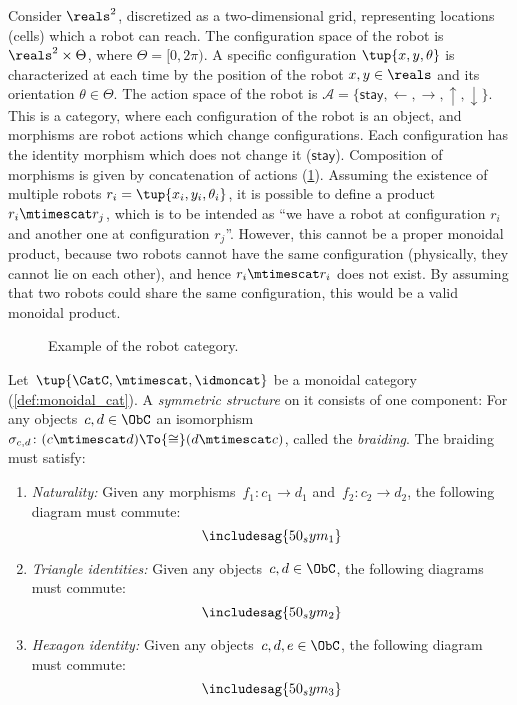 \begin{example}
  \label{ex:robot}
  Consider $\reals^2$, discretized as a two-dimensional grid, representing locations (cells) which a robot can reach. The configuration space of the robot is $\reals^2\times \Theta$, where $\Theta=[0,2\pi)$. A specific configuration $\tup{x,y,\theta}$ is characterized at each time by the position of the robot $x,y\in \reals$ and its orientation $\theta \in \Theta$. The action space of the robot is $\mathcal{A}=\{\mathsf{stay},\leftarrow, \rightarrow, \uparrow, \downarrow\}$. This is a category, where each configuration of the robot is an object, and morphisms are robot actions which change configurations. Each configuration has the identity morphism which does not change it ($\mathsf{stay}$). Composition of morphisms is given by concatenation of actions (\cref{fig:robotcategory}). Assuming the existence of multiple robots $r_i=\tup{x_i,y_i,\theta_i}$, it is possible to define a product $r_i\mtimescat r_j$, which is to be intended as ``we have a robot at configuration $r_i$ and another one at configuration $r_j$''. However, this cannot be a proper monoidal product, because two robots cannot have the same configuration (physically, they cannot lie on each other), and hence $r_i\mtimescat r_i$ does not exist. By assuming that two robots could share the same configuration, this would be a valid monoidal product.
  \begin{figure}[tbh]
    \begin{center}
    \end{center}
    \caption{Example of the robot category. \label{fig:robotcategory}}
  \end{figure}
\end{example}


\begin{ctdefinition}
  Let~$\tup{\CatC,\mtimescat,\idmoncat}$ be a monoidal category (\cref{def:monoidal_cat}). A \emph{symmetric structure} on it consists of one component: For any objects~$c,d\in\ObC$ an isomorphism~$\sigma_{c,d}\colon (c\mtimescat d)\To{\cong}(d\mtimescat c)$, called the \emph{braiding}. The braiding must satisfy:
  \begin{enumerate}
    \item \emph{Naturality:} Given any morphisms~$f_1\colon c_1\to d_1$ and~$f_2\colon c_2\to d_2$, the following diagram must commute:
    \begin{equation}
      \includesag{50_sym_1}
    \end{equation}
    \item \emph{Triangle identities:} Given any objects~$c,d\in\ObC$, the following diagrams must commute:
    \begin{equation}
      \includesag{50_sym_2}
    \end{equation}
    \item \emph{Hexagon identity:} Given any objects~$c,d,e\in \ObC$, the following diagram must commute:
    \begin{equation}
      \includesag{50_sym_3}
    \end{equation}
  \end{enumerate}
\end{ctdefinition}

